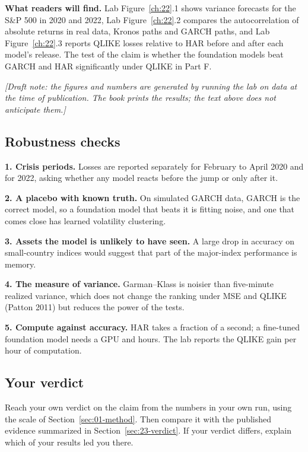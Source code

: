 \textbf{What readers will find.} Lab Figure~\ref{ch:22}.1 shows variance forecasts for the S\&P 500 in 2020 and 2022, Lab Figure~\ref{ch:22}.2 compares the autocorrelation of absolute returns in real data, Kronos paths and GARCH paths, and Lab Figure~\ref{ch:22}.3 reports QLIKE losses relative to HAR before and after each model's release. The test of the claim is whether the foundation models beat GARCH and HAR significantly under QLIKE in Part F.

\emph{[Draft note: the figures and numbers are generated by running the lab on data at the time of publication. The book prints the results; the text above does not anticipate them.]}

\subsection{Robustness checks}
\label{sec:23-stress}

\textbf{1. Crisis periods.} Losses are reported separately for February to April 2020 and for 2022, asking whether any model reacts before the jump or only after it.

\textbf{2. A placebo with known truth.} On simulated GARCH data, GARCH is the correct model, so a foundation model that beats it is fitting noise, and one that comes close has learned volatility clustering.

\textbf{3. Assets the model is unlikely to have seen.} A large drop in accuracy on small-country indices would suggest that part of the major-index performance is memory.

\textbf{4. The measure of variance.} Garman--Klass is noisier than five-minute realized variance, which does not change the ranking under MSE and QLIKE (Patton 2011) but reduces the power of the tests.

\textbf{5. Compute against accuracy.} HAR takes a fraction of a second; a fine-tuned foundation model needs a GPU and hours. The lab reports the QLIKE gain per hour of computation.

\subsection*{Your verdict}

Reach your own verdict on the claim from the numbers in your own run, using the scale of Section~\ref{sec:01-method}. Then compare it with the published evidence summarized in Section~\ref{sec:23-verdict}. If your verdict differs, explain which of your results led you there.

